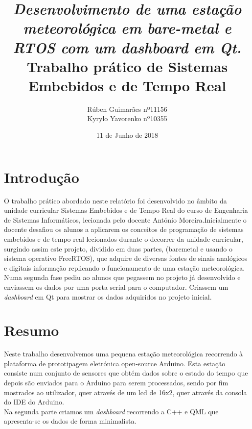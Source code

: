\documentclass[11pt]{report}
\title{\textbf{\textit{Desenvolvimento de uma estação meteorológica em bare-metal e RTOS com um dashboard em Qt.}\\
		\large Trabalho prático de
		Sistemas Embebidos e de Tempo Real }}
\author{Rúben Guimarães nº11156\\ Kyrylo Yavorenko nº10355 }
\affil{Escola Superior de Tecnologia, IPCA \\
	Barcelos}
\date{11 de Junho de 2018}
\begin{document}
\maketitle




\tableofcontents


\chapter*{Introdução}


O trabalho prático abordado neste relatório foi desenvolvido no âmbito da unidade curricular Sistemas Embebidos e de Tempo Real do curso de Engenharia de Sistemas Informáticos, lecionada pelo docente António Moreira.\newline Inicialmente o docente desafiou os alunos a aplicarem os conceitos de programação de sistemas embebidos e de tempo real lecionados durante o decorrer da unidade curricular, surgindo assim este projeto, dividido em duas partes, (baremetal e usando o sistema operativo FreeRTOS), que adquire de diversas fontes de sinais analógicos e digitais informação replicando o funcionamento de uma estação meteorológica. \\
Numa segunda fase pediu ao alunos que pegassem no projeto já desenvolvido e enviassem os dados por uma porta serial para o computador. Criassem um \textit{dashboard} em Qt para mostrar os dados adquiridos no projeto inicial.


\clearpage



\chapter*{Resumo}

Neste trabalho desenvolvemos uma pequena estação meteorológica recorrendo à plataforma de prototipagem eletrónica open-source Arduino. Esta estação consiste num conjunto de sensores que obtém dados sobre o estado do tempo que depois são enviados para o Arduino para serem processados, sendo por fim mostrados ao utilizador, quer através de um lcd de 16x2, quer através da consola do IDE do Arduino. \\
Na segunda parte criamos um \textit{dashboard} recorrendo a C++ e QML que apresenta-se os dados de forma minimalista.


\clearpage
\end{document}
